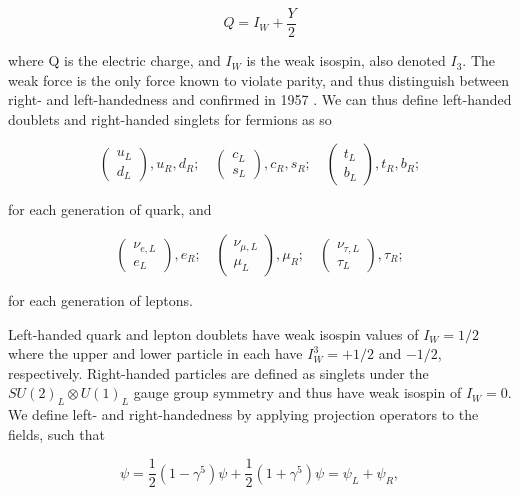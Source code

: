 \begin{equation}
Q = I_W + \frac{Y}{2}
\end{equation}

where Q is the electric charge, and $I_W$ is the weak isospin, also denoted $I_3$. The weak force is the only force known to violate parity, and thus distinguish between right- and left-handedness and confirmed in 1957 \cite{PhysRev.105.1413}. We can thus define left-handed doublets and right-handed singlets for fermions as so

\begin{equation}
\begin{pmatrix}
u_L \\
d_L
\end{pmatrix}
,u_R,d_R;
\quad
\begin{pmatrix}
c_L \\
s_L
\end{pmatrix}
,c_R, s_R;
\quad
\begin{pmatrix}
t_L \\
b_L
\end{pmatrix}
,t_R, b_R;
\end{equation}

for each generation of quark, and

\begin{equation}
\begin{pmatrix}
\nu_{e,L} \\
e_L
\end{pmatrix}
,e_R;
\quad
\begin{pmatrix}
\nu_{\mu,L} \\
\mu_L
\end{pmatrix}
,\mu_R;
\quad
\begin{pmatrix}
\nu_{\tau,L} \\
\tau_L
\end{pmatrix}
,\tau_R;
\end{equation}

for each generation of leptons. 

Left-handed quark and lepton doublets have weak isospin values of $I_W = 1/2$ where the upper and lower particle in each have $I^3_W = +1/2$ and $-1/2$, respectively. Right-handed particles are defined as singlets under the $SU(2)_L \otimes U(1)_L$ gauge group symmetry and thus have weak isospin of $I_W = 0$. We define left- and right-handedness by applying projection operators to the fields, such that

\begin{equation}
\psi = \frac{1}{2}(1-\gamma^5)\psi + \frac{1}{2}(1+\gamma^5)\psi = \psi_L + \psi_R,
\end{equation}

